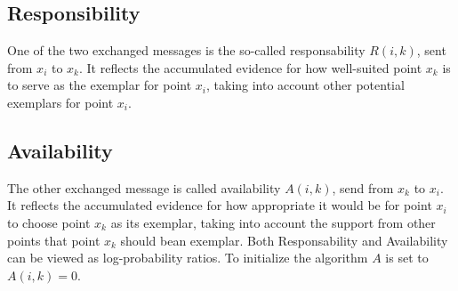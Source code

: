 \documentclass[11pt,a4paper]{article}
\begin{document}
\subsection{Responsibility}
One of the two exchanged messages is the so-called responsability $R(i,k)$, sent from $x_i$ to $x_k$. It reflects the accumulated evidence for how well-suited point $x_k$ is to serve as the exemplar for point $x_i$, taking into account other potential exemplars for point $x_i$.\cite{frey2007clustering}
\subsection{Availability}
The other exchanged message is called availability $A(i,k)$, send from $x_k$ to $x_i$. It reflects the accumulated evidence for how appropriate it would be for point $x_i$ to choose point $x_k$ as its exemplar, taking into account the support from other points that point $x_k$ should bean exemplar. Both Responsability and Availability can be viewed as log-probability ratios. To initialize the algorithm $A$ is set to $A(i,k) = 0$.\cite{frey2007clustering}
\pagebreak
\end{document}
